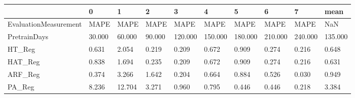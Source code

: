\begin{tabular}{llllllllll}
\toprule
{} &      0 &      1 &      2 &       3 &       4 &       5 &       6 &       7 &    mean \\
\midrule
EvaluationMeasurement &   MAPE &   MAPE &   MAPE &    MAPE &    MAPE &    MAPE &    MAPE &    MAPE &     NaN \\
PretrainDays          & 30.000 & 60.000 & 90.000 & 120.000 & 150.000 & 180.000 & 210.000 & 240.000 & 135.000 \\
HT\_Reg                &  0.631 &  2.054 &  0.219 &   0.209 &   0.672 &   0.909 &   0.274 &   0.216 &   0.648 \\
HAT\_Reg               &  0.838 &  1.694 &  0.235 &   0.209 &   0.672 &   0.909 &   0.274 &   0.216 &   0.631 \\
ARF\_Reg               &  0.374 &  3.266 &  1.642 &   0.204 &   0.664 &   0.884 &   0.526 &   0.030 &   0.949 \\
PA\_Reg                &  8.236 & 12.704 &  3.271 &   0.960 &   0.795 &   0.446 &   0.446 &   0.218 &   3.384 \\
\bottomrule
\end{tabular}
